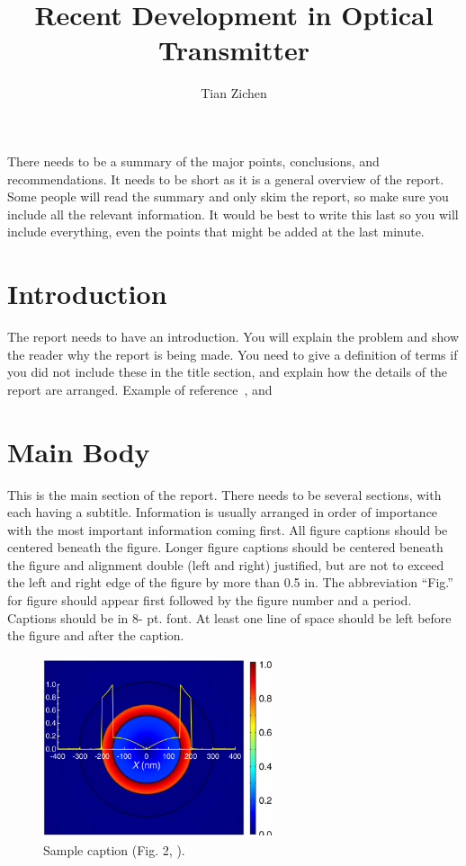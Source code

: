 \documentclass{osa-article}
\begin{document}
\title{Recent Development in Optical Transmitter}
\author{Tian Zichen\authormark{*}}
\address{School of Electrical and Electronic Engineering, Nanyang Technological University, 50 Nanyang Avenue, 639798, Singapore}

\begin{abstract*}
There needs to be a summary of the major points, conclusions, and recommendations. It needs to be short as it is a general overview of the report. Some people will read the summary and only skim the report, so make sure you include all the relevant information. It would be best to write this last so you will include everything, even the points that might be added at the last minute.
\end{abstract*}

\section{Introduction}
The report needs to have an introduction. You will explain the problem and show the reader why the report is being made. You need to give a definition of terms if you did not include these in the title section, and explain how the details of the report are arranged. Example of reference~\cite{gallo1999all, masters1998three}, and~\cite{Yelin:03}

\section{Main Body}

This is the main section of the report.  There needs to be several sections, with each having a subtitle.  Information is usually arranged in order of importance with the most important information coming first.
All figure captions should be centered beneath the figure. Longer figure captions should be centered beneath the figure and alignment double (left and right) justified, but are not to exceed the left and right edge of the figure by more than 0.5 in. The abbreviation “Fig.” for figure should appear first followed by the figure number and a period. Captions should be in 8- pt. font. At least one line of space should be left before the figure and after the caption.


\begin{figure}[h!]
\centering
\includegraphics[width=0.6\textwidth]{osafig1.pdf}
\caption{Sample caption (Fig. 2, \cite{Yelin:03}).}
\end{figure}
\end{document}
